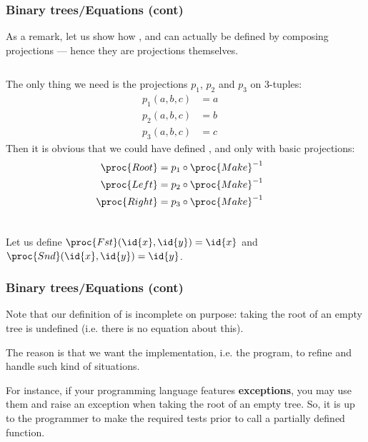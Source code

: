 %
\begin{frame}
\frametitle{Binary trees/Equations (cont)}

As a remark, let us show how ,  and
 can actually be defined by composing projections
--- hence they are projections themselves.

\bigskip

\begin{columns}
    The only thing we need is the projections \(p_1\), \(p_2\) and
    \(p_3\) on 3-tuples:
    \begin{align*}
      p_1 (a,b,c) &= a\\
      p_2 (a,b,c) &= b\\
      p_3 (a,b,c) &= c
    \end{align*}
    Then it is obvious that we could have defined
    ,  and  only with basic
    projections:
    \begin{align*}
      \proc{Root} &= p_1 \circ \proc{Make}^{-1}\\
      \proc{Left} &= p_2 \circ \proc{Make}^{-1}\\
      \proc{Right} &= p_3 \circ \proc{Make}^{-1}
    \end{align*}
\end{columns}

\bigskip

Let us define \(\proc{Fst} (\id{x}, \id{y}) = \id{x}\) and
\(\proc{Snd} (\id{x}, \id{y}) = \id{y}\).

\end{frame}

%
\begin{frame}
\frametitle{Binary trees/Equations (cont)}

Note that our definition of  is incomplete on purpose:
taking the root of an empty tree is undefined (i.e. there is no
equation about this).

\bigskip

The reason is that we want the implementation, i.e. the program, to
refine and handle such kind of situations.

\bigskip

For instance, if your programming language features
\textbf{exceptions}, you may use them and raise an exception when
taking the root of an empty tree. So, it is up to the programmer to
make the required tests prior to call a partially defined function.

\end{frame}


